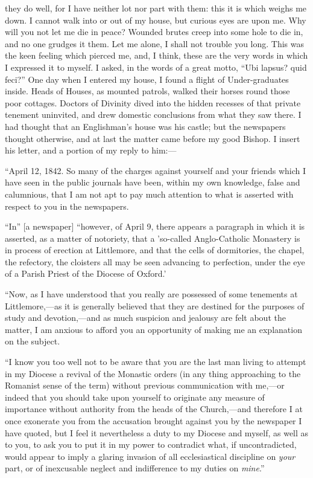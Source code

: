 they do well, for I have neither lot nor part with them: this it is
which weighs me down. I cannot walk into or out of my house, but curious
eyes are upon me. Why will you not let me die in peace? Wounded brutes
creep into some hole to die in, and no one grudges it them. Let me
alone, I shall not trouble you long. This was the keen feeling
which pierced me, and, I think, these are the very words in which I
expressed it to myself. I asked, in the words of a great motto, ``Ubi
lapsus? quid feci?'' One day when I entered my house, I found a flight of
Under-graduates inside. Heads of Houses, as mounted patrols, walked their
horses round those poor cottages. Doctors of Divinity dived into the
hidden recesses of that private tenement uninvited, and drew domestic
conclusions from what they saw there. I had thought that an Englishman's
house was his castle; but the newspapers thought otherwise, and at last
the matter came before my good Bishop. I insert his letter, and a
portion of my reply to him:—

``April 12, 1842. So many of the charges against yourself
and your friends which I have seen in the public journals have been,
within my own knowledge, false and calumnious, that I am not apt to pay
much attention to what is asserted with respect to you in the
newspapers.

``In'' [a newspaper] ``however, of April 9,
there appears a paragraph in which it is asserted, as a matter of
notoriety, that a 'so-called Anglo-Catholic Monastery is in process of
erection at Littlemore, and that the cells of dormitories, the chapel,
the refectory, the cloisters all may be seen advancing to perfection,
under the eye of a Parish Priest of the Diocese of Oxford.'

``Now, as I have understood that you really are possessed of some
tenements at Littlemore,—as it is generally believed that they are
destined for the purposes of study and devotion,—and as much suspicion
and jealousy are felt about the matter, I am anxious to afford you an
opportunity of making me an explanation on the subject.

``I know you too well not to be aware that you are the last man
living to attempt in my Diocese a revival of the Monastic orders (in any
thing approaching to the Romanist sense of the term) without previous
communication with me,—or indeed that you should take upon yourself to
originate any measure of importance without authority from the heads of
the Church,—and therefore I at once exonerate you from the accusation
brought against you by the newspaper I have quoted, but I feel it
nevertheless a duty to my Diocese and myself, as well as to you, to ask
you to put it in my power to contradict what, if uncontradicted, would
appear to imply a glaring invasion of all ecclesiastical discipline on \emph{your}
part, or of inexcusable neglect and indifference to my duties on \emph{mine}.''


